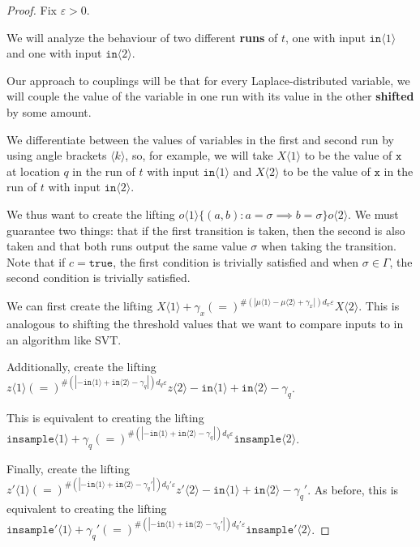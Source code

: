 \documentclass[12pt]{article}
\newcommand{\brangle}[1]{\langle#1 \rangle}
\theoremstyle{definition}
\begin{document}
\begin{proof}
Fix $\varepsilon>0$.

We will analyze the behaviour of two different \textbf{runs} of $t$, one with input $\texttt{in}\brangle{1}$ and one with input $\texttt{in}\brangle{2}$. 

Our approach to couplings will be that for every Laplace-distributed variable, we will couple the value of the variable in one run with its value in the other \textbf{shifted} by some amount. 

We differentiate between the values of variables in the first and second run by using angle brackets $\brangle{k}$, so, for example, we will take $X\brangle{1}$ to be the value of $\texttt{x}$ at location $q$ in the run of $t$ with input $\texttt{in}\brangle{1}$ and $X\brangle{2}$ to be the value of $\texttt{x}$ in the run of $t$ with input $\texttt{in}\brangle{2}$. 

We thus want to create the lifting $o\brangle{1}\{(a, b): a=\sigma\implies b=\sigma\}o\brangle{2}$. We must guarantee two things: that if the first transition is taken, then the second is also taken and that both runs output the same value $\sigma$ when taking the transition. Note that if $c = \texttt{true}$, the first condition is trivially satisfied and when $\sigma\in \Gamma$, the second condition is trivially satisfied. 

We can first create the lifting $X\brangle{1}+\gamma_x (=)^{\#(|\mu\brangle{1}-\mu\brangle{2}+\gamma_x|)d_x\varepsilon}X\brangle{2}$. This is analogous to shifting the threshold values that we want to compare inputs to in an algorithm like SVT. 

Additionally, create the lifting $z\brangle{1} (=)^{\#(|-\texttt{in}\brangle{1}+\texttt{in}\brangle{2}-\gamma_q|)d_q\varepsilon}z\brangle{2} - \texttt{in}\brangle{1}+\texttt{in}\brangle{2}-\gamma_q$. 

This is equivalent to creating the lifting $\texttt{insample}\brangle{1} +\gamma_q{(=)}^{\#(|-\texttt{in}\brangle{1}+\texttt{in}\brangle{2}-\gamma_q|)d_q\varepsilon}\texttt{insample}\brangle{2}$.

Finally, create the lifting $z'\brangle{1} (=)^{\#(|-\texttt{in}\brangle{1}+\texttt{in}\brangle{2}-\gamma_q'|)d_q'\varepsilon}z'\brangle{2} - \texttt{in}\brangle{1}+\texttt{in}\brangle{2}-\gamma_q'$. As before, this is equivalent to creating the lifting $\texttt{insample}'\brangle{1} +\gamma_q'{(=)}^{\#(|-\texttt{in}\brangle{1}+\texttt{in}\brangle{2}-\gamma_q'|)d_q'\varepsilon}\texttt{insample}'\brangle{2}$.


\end{proof}
\end{document}
